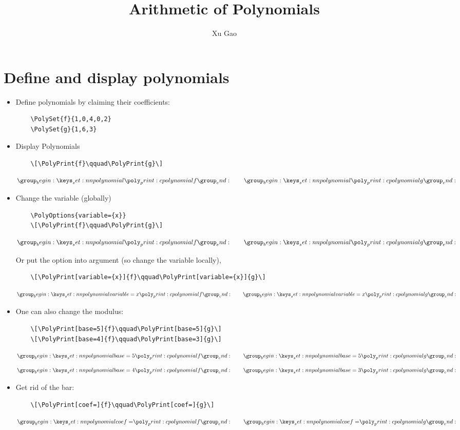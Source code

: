 \documentclass[11pt]{article}
\title{Arithmetic of Polynomials}
\author{Xu Gao}
\date{}
\theoremstyle{plain}
\theoremstyle{definition}
\theoremstyle{remark}
\numberwithin{equation}{problem}
\begin{document}
\maketitle

\section{Define and display polynomials}
\begin{itemize}
	\item 
Define polynomials by claiming their coefficients:
\begin{verbatim}
	\PolySet{f}{1,0,4,0,2}
	\PolySet{g}{1,6,3}
\end{verbatim}

\item 
Display Polynomials
\begin{verbatim}
	\[\PolyPrint{f}\qquad\PolyPrint{g}\]
\end{verbatim}

\[\PolyPrint{f}\qquad\PolyPrint{g}\]

\item 
\begingroup
Change the variable (globally)
\begin{verbatim}
	\PolyOptions{variable={x}}
	\[\PolyPrint{f}\qquad\PolyPrint{g}\]
\end{verbatim}
\[\PolyPrint{f}\qquad\PolyPrint{g}\]
\endgroup

Or put the option into argument (so change the variable locally),
\begin{verbatim}
	\[\PolyPrint[variable={x}]{f}\qquad\PolyPrint[variable={x}]{g}\]
\end{verbatim}
\[\PolyPrint[variable={x}]{f}\qquad\PolyPrint[variable={x}]{g}\]

\item 
One can also change the modulus:
\begin{verbatim}
	\[\PolyPrint[base=5]{f}\qquad\PolyPrint[base=5]{g}\]
	\[\PolyPrint[base=4]{f}\qquad\PolyPrint[base=3]{g}\]
\end{verbatim}
\[\PolyPrint[base=5]{f}\qquad\PolyPrint[base=5]{g}\]
\[\PolyPrint[base=4]{f}\qquad\PolyPrint[base=3]{g}\]

\item 
Get rid of the bar:
\begin{verbatim}
	\[\PolyPrint[coef=]{f}\qquad\PolyPrint[coef=]{g}\]
\end{verbatim}
\[\PolyPrint[coef=]{f}\qquad\PolyPrint[coef=]{g}\]

\end{itemize}
\end{document}
